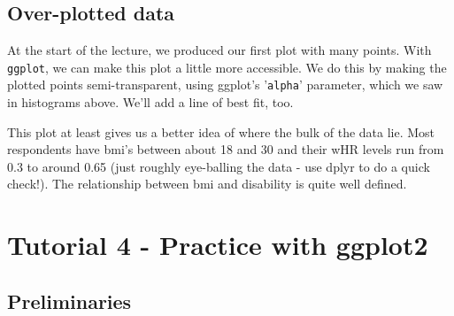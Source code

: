 \documentclass[titlepage]{book}\usepackage{knitr}
\begin{document}
\section{Over-plotted data}
At the start of the lecture, we produced our first plot with many points. With \texttt{ggplot}, we can make this plot a little more accessible.
We do this by making the plotted points semi-transparent, using ggplot's '\texttt{alpha}' parameter, which we saw in histograms above. We'll add a line of best fit, too.
\begin{knitrout}
\color{fgcolor}\begin{kframe}
\begin{alltt}
 \hlkwb{<-}  \hlstd{(}   
 \hlkwb{<-}  \hlopt{+} \hlstd{(}\hlstd{=}\hlstd{)}
 \hlkwb{<-}  \hlopt{+} \hlstd{(}   \hlstd{=} \hlstd{)}
\end{alltt}
\end{kframe}
\end{knitrout}
This plot at least gives us a better idea of where the bulk of the data lie.  Most respondents have bmi's between about 18 and 30 and their wHR levels run from 0.3 to around 0.65 (just roughly eye-balling the data -  use dplyr to do a quick check!). The relationship between bmi and disability is quite well defined.













\chapter{Tutorial 4 -   Practice with ggplot2}\label{T4}

\author{Brian Williams $<$\href{mailto:bjw649@gmail.com}%
{bjw649@gmail.com}$>$}


\section{Preliminaries}
\end{document}
